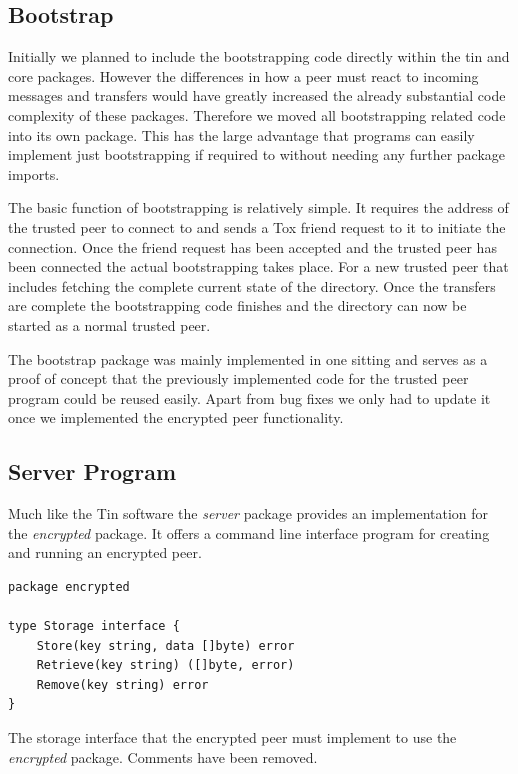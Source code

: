 \subsection{Bootstrap}
\label{sub:Bootstrap}

Initially we planned to include the bootstrapping code directly within the tin and core packages.
However the differences in how a peer must react to incoming messages and transfers would have greatly increased the already substantial code complexity of these packages.
Therefore we moved all bootstrapping related code into its own package.
This has the large advantage that programs can easily implement just bootstrapping if required to without needing any further package imports.

The basic function of bootstrapping is relatively simple.
It requires the address of the trusted peer to connect to and sends a Tox friend request to it to initiate the connection.
Once the friend request has been accepted and the trusted peer has been connected the actual bootstrapping takes place.
For a new trusted peer that includes fetching the complete current state of the directory.
Once the transfers are complete the bootstrapping code finishes and the directory can now be started as a normal trusted peer.

The bootstrap package was mainly implemented in one sitting and serves as a proof of concept that the previously implemented code for the trusted peer program could be reused easily.
Apart from bug fixes we only had to update it once we implemented the encrypted peer functionality.

\subsection{Server Program}
\label{sub:Server Program}

Much like the Tin software the \emph{server} package provides an implementation for the \emph{encrypted} package.
It offers a command line interface program for creating and running an encrypted peer.

\begin{listing}[htp]
    \begin{lstlisting}[language=golang,firstnumber=0]
package encrypted

type Storage interface {
	Store(key string, data []byte) error
	Retrieve(key string) ([]byte, error)
	Remove(key string) error
}
    \end{lstlisting}
\caption[Encrypted Storage Interface]{The storage interface that the encrypted peer must implement to use the \emph{encrypted} package. Comments have been removed.}
\label{golang:storage_interface}
\end{listing}

